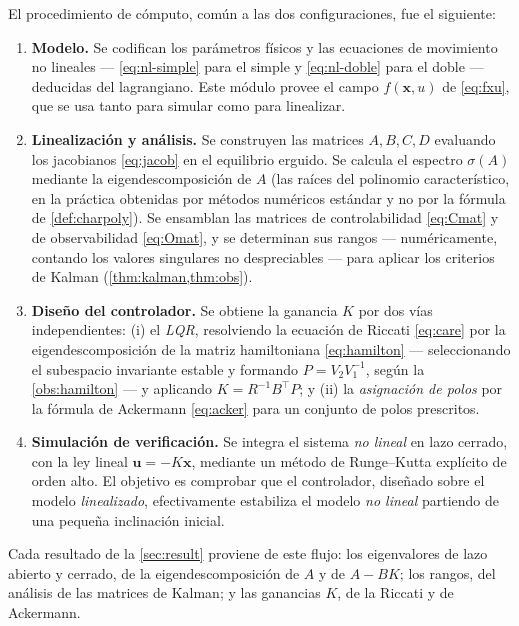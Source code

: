 \documentclass[11pt,letterpaper]{article}
\theoremstyle{definition}
\theoremstyle{plain}
\theoremstyle{remark}
\newcommand{\xv}{\bm{x}}
\newcommand{\uv}{\bm{u}}
\begin{document}
El procedimiento de cómputo, común a las dos configuraciones, fue el
siguiente:

\begin{enumerate}
  \item \textbf{Modelo.} Se codifican los parámetros físicos y las
  ecuaciones de movimiento no lineales --- \cref{eq:nl-simple} para el
  simple y \cref{eq:nl-doble} para el doble --- deducidas del lagrangiano.
  Este módulo provee el campo $f(\xv,u)$ de \cref{eq:fxu}, que se usa
  tanto para simular como para linealizar.

  \item \textbf{Linealización y análisis.} Se construyen las matrices
  $A,B,C,D$ evaluando los jacobianos \cref{eq:jacob} en el equilibrio
  erguido. Se calcula el espectro $\sigma(A)$ mediante la
  eigendescomposición de $A$ (las raíces del polinomio característico, en
  la práctica obtenidas por métodos numéricos estándar y no por la
  fórmula de \cref{def:charpoly}). Se ensamblan las matrices de
  controlabilidad \cref{eq:Cmat} y de observabilidad \cref{eq:Omat}, y se
  determinan sus rangos --- numéricamente, contando los valores
  singulares no despreciables --- para aplicar los criterios de Kalman
  (\cref{thm:kalman,thm:obs}).

  \item \textbf{Diseño del controlador.} Se obtiene la ganancia $K$ por
  dos vías independientes: (i) el \emph{LQR}, resolviendo la ecuación de
  Riccati \cref{eq:care} por la eigendescomposición de la matriz
  hamiltoniana \cref{eq:hamilton} --- seleccionando el subespacio
  invariante estable y formando $P=V_2V_1^{-1}$, según la
  \cref{obs:hamilton} --- y aplicando $K=R^{-1}B^\top P$; y (ii) la
  \emph{asignación de polos} por la fórmula de Ackermann \cref{eq:acker}
  para un conjunto de polos prescritos.

  \item \textbf{Simulación de verificación.} Se integra el sistema
  \emph{no lineal} en lazo cerrado, con la ley lineal $\uv=-K\xv$,
  mediante un método de Runge--Kutta explícito de orden alto. El objetivo
  es comprobar que el controlador, diseñado sobre el modelo
  \emph{linealizado}, efectivamente estabiliza el modelo \emph{no lineal}
  partiendo de una pequeña inclinación inicial.
\end{enumerate}

Cada resultado de la \cref{sec:result} proviene de este flujo: los
eigenvalores de lazo abierto y cerrado, de la eigendescomposición de $A$
y de $A-BK$; los rangos, del análisis de las matrices de Kalman; y las
ganancias $K$, de la Riccati y de Ackermann.
\end{document}
